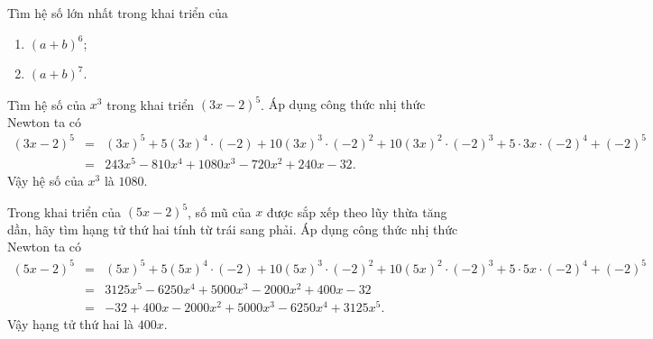 \begin{vd}%
%
Tìm hệ số lớn nhất trong khai triển của
\begin{enumerate}
\item $(a+b)^6$;
\item $(a+b)^7$.
\end{enumerate}
\end{vd}

\baitaptl

\begin{bt}%
%
Tìm hệ số của $x^3$ trong khai triển $(3x-2)^5$.
\loigiai
{
Áp dụng công thức nhị thức Newton ta có
\begin{eqnarray*}
(3x-2)^5 & = & (3x)^5+5(3x)^4\cdot (-2)+10(3x)^3\cdot (-2)^2+10(3x)^2\cdot (-2)^3+5\cdot 3x\cdot (-2)^4+(-2)^5\\
& = & 243x^5-810x^4+1080x^3-720x^2+240x-32.
\end{eqnarray*}
Vậy hệ số của $x^3$ là $1080$.
}
\end{bt}

\begin{bt}%
%
Trong khai triển của $(5x-2)^5$, số mũ của $x$ được sắp xếp theo lũy thừa tăng dần, hãy tìm hạng tử thứ hai tính từ trái sang phải.
\loigiai
{
Áp dụng công thức nhị thức Newton ta có
\begin{eqnarray*}
(5x-2)^5 & = & (5x)^5+5(5x)^4\cdot (-2)+10(5x)^3\cdot (-2)^2+10(5x)^2\cdot (-2)^3+5\cdot 5x\cdot (-2)^4+(-2)^5\\
& = & 3125x^5-6250x^4+5000x^3-2000x^2+400x-32\\
& = & -32+400x-2000x^2+5000x^3-6250x^4+3125x^5.
\end{eqnarray*}
Vậy hạng tử thứ hai là $400x$.
}
\end{bt}

